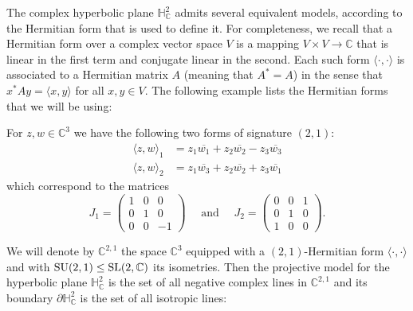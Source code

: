 \documentclass{report}
\begin{document}
The complex hyperbolic plane $\mathbb H^2_{\mathbb C}$ admits several equivalent models, according to the Hermitian form that is used to define it.
For completeness, we recall that a Hermitian form over a complex vector space $V$ is a mapping $V\times V \to \mathbb C$ that is linear in the first term and conjugate linear in the second.
Each such form $\langle \cdot, \cdot \rangle$ is associated to a Hermitian matrix $A$ (meaning that $A^* = A$) in the sense that $x^* A y = \langle x, y \rangle$ for all $x, y \in V$.
The following example lists the Hermitian forms that we will be using:
\begin{example}
    For $z, w \in \mathbb C^3$ we have the following two forms of signature $(2,1)$:
    \begin{align*}
        \langle z, w \rangle_1 &= z_1 \overline{w_1} + z_2 \overline{w_2} - z_3 \overline{w_3}\\
        \langle z, w \rangle_2 &= z_1 \overline{w_3} + z_2 \overline{w_2} + z_3 \overline{w_1}
    \end{align*}
    which correspond to the matrices
    \[
    J_1 = \begin{pmatrix}
        1 & 0 & 0\\
        0 & 1 & 0\\
        0 & 0 & -1
    \end{pmatrix} \quad \text{ and } \quad
    J_2 = \begin{pmatrix}
        0 & 0 & 1\\
        0 & 1 & 0\\
        1 & 0 & 0
    \end{pmatrix}.
    \]
\end{example}

We will denote by $\mathbb C^{2,1}$ the space $\mathbb C^3$ equipped with a $(2,1)$-Hermitian form $\langle \cdot, \cdot \rangle$ and with $\operatorname{{\mathrm{SU}}}(2,1) \leq \operatorname{{\mathrm{SL}}}(2, \mathbb C)$ its isometries.
Then the projective model for the hyperbolic plane $\mathbb H^2_{\mathbb C}$ is the set of all negative complex lines in $\mathbb C^{2,1}$ and its boundary $\partial \mathbb H^2_{\mathbb C}$ is the set of all isotropic lines:
\end{document}
